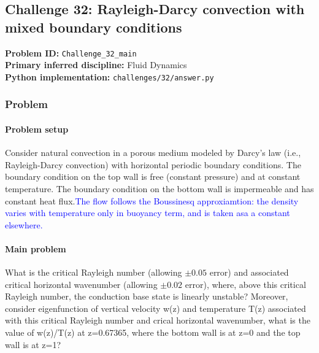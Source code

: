 \subsection[Challenge 32: Rayleigh-Darcy convection with mixed boundary conditions]{Challenge 32: Rayleigh-Darcy convection with mixed boundary conditions}
\textbf{Problem ID:} \texttt{Challenge\_32\_main}\\
\textbf{Primary inferred discipline:} Fluid Dynamics\\
\textbf{Python implementation:} \texttt{challenges/32/answer.py}

\subsubsection*{Problem}
\paragraph*{Problem setup}
Consider natural convection in a porous medium modeled by Darcy's law (i.e., Rayleigh-Darcy convection) with horizontal periodic boundary conditions. The boundary condition on the top wall is free (constant pressure) and at constant temperature. The boundary condition on the bottom wall is impermeable and has constant heat flux.\textcolor{blue}{The flow follows the Boussinesq approxiamtion: the density varies with temperature only in buoyancy term, and is taken asa a constant elsewhere.}

\paragraph*{Main problem}

What is the critical Rayleigh number (allowing $\pm 0.05$ error) and associated critical horizontal wavenumber (allowing $\pm 0.02$ error), where, above this critical Rayleigh number, the conduction base state is linearly unstable? Moreover, consider eigenfunction of vertical velocity w(z) and temperature T(z) associated with this critical Rayleigh number and crical horizontal wavenumber, what is the value of w(z)/T(z) at z=0.67365, where the bottom wall is at z=0 and the top wall is at z=1?
